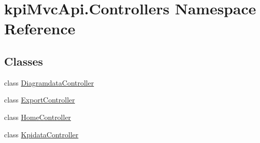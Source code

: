 \hypertarget{namespacekpi_mvc_api_1_1_controllers}{}\section{kpi\+Mvc\+Api.\+Controllers Namespace Reference}
\label{namespacekpi_mvc_api_1_1_controllers}
\subsection*{Classes}
\begin{DoxyCompactItemize}
\item 
class \hyperlink{classkpi_mvc_api_1_1_controllers_1_1_diagramdata_controller}{Diagramdata\+Controller}
\item 
class \hyperlink{classkpi_mvc_api_1_1_controllers_1_1_export_controller}{Export\+Controller}
\item 
class \hyperlink{classkpi_mvc_api_1_1_controllers_1_1_home_controller}{Home\+Controller}
\item 
class \hyperlink{classkpi_mvc_api_1_1_controllers_1_1_kpidata_controller}{Kpidata\+Controller}
\end{DoxyCompactItemize}
